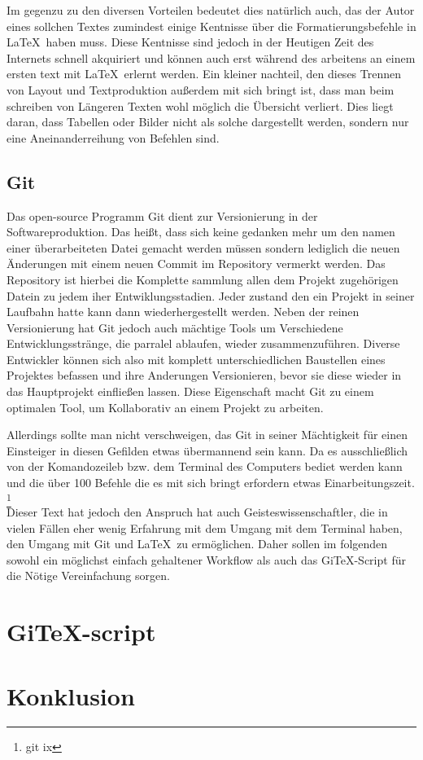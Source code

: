 \documentclass[12pt,a4paper]{scrartcl}
\begin{document}
Im gegenzu zu den diversen Vorteilen bedeutet dies natürlich auch, das der Autor eines sollchen Textes zumindest einige Kentnisse über die Formatierungsbefehle in \LaTeX \ haben muss. Diese Kentnisse sind jedoch in der Heutigen Zeit des Internets schnell akquiriert und können auch erst während des arbeitens an einem ersten text mit \LaTeX \ erlernt werden. Ein kleiner nachteil, den dieses Trennen von Layout und Textproduktion außerdem mit sich bringt ist, dass man beim schreiben von Längeren Texten wohl möglich die Übersicht verliert. Dies liegt daran, dass Tabellen oder Bilder nicht als solche dargestellt werden, sondern nur eine Aneinanderreihung von Befehlen sind.

\subsection{Git}

Das open-source Programm Git dient zur Versionierung in der Softwareproduktion. Das heißt, dass sich keine gedanken mehr um den namen einer überarbeiteten Datei gemacht werden müssen sondern lediglich die neuen Änderungen mit einem neuen Commit im Repository vermerkt werden. Das Repository ist hierbei die Komplette sammlung allen dem Projekt zugehörigen Datein zu jedem iher Entwiklungsstadien. Jeder zustand den ein Projekt in seiner Laufbahn hatte kann dann wiederhergestellt werden. Neben der reinen Versionierung hat Git jedoch auch mächtige Tools um Verschiedene Entwicklungsstränge, die parralel ablaufen, wieder zusammenzuführen. Diverse Entwickler können sich also mit komplett unterschiedlichen Baustellen eines Projektes befassen und ihre Anderungen Versionieren, bevor sie diese wieder in das Hauptprojekt einfließen lassen. Diese Eigenschaft macht Git zu einem optimalen Tool, um Kollaborativ an einem Projekt zu arbeiten. 

Allerdings sollte man nicht verschweigen, das Git in seiner Mächtigkeit für einen Einsteiger in diesen Gefilden etwas übermannend sein kann. Da es ausschließlich von der Komandozeileb bzw. dem Terminal des Computers bediet werden kann und die über 100 Befehle die es mit sich bringt erfordern etwas Einarbeitungszeit. \footnote{git ix} 
\bigskip \\
Dieser Text hat jedoch den Anspruch hat auch Geisteswissenschaftler, die in vielen Fällen eher wenig Erfahrung mit dem Umgang mit dem Terminal haben, den Umgang mit Git und \LaTeX \ zu ermöglichen. Daher sollen im folgenden sowohl ein möglichst einfach gehaltener Workflow als auch das GiTeX-Script für die Nötige Vereinfachung sorgen.

\section{GiTeX-script}



\section{Konklusion}
\end{document}
